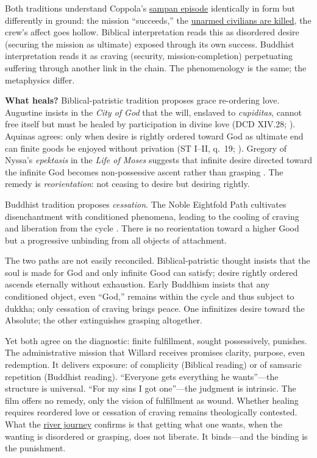 Both traditions understand Coppola's \hyperref[scene:sampan]{sampan episode} identically in
form but differently in ground: the mission ``succeeds,'' the
\hyperref[scene:sampan]{unarmed civilians are killed}, the crew's affect goes hollow. Biblical
interpretation reads this as disordered desire
(securing the mission as ultimate) exposed through its own success. Buddhist interpretation
reads it as craving (security, mission-completion) perpetuating suffering through another link
in the chain. The
phenomenology is the same; the metaphysics differ.

\textbf{What heals?} Biblical-patristic tradition proposes grace re-ordering love. Augustine
insists in the \emph{City of God} that the will, enslaved to \emph{cupiditas}, cannot free
itself but must be healed by participation in divine love (DCD XIV.28;
\parencite{AugustineCity2003}). Aquinas agrees: only when desire is rightly ordered toward God
as ultimate end can finite goods be enjoyed without privation (ST I--II, q.~19;
\parencite{AquinasST1947}). Gregory of Nyssa's \emph{epektasis} in the \emph{Life of Moses}
suggests that infinite desire directed toward the infinite God becomes non-possessive ascent
rather than grasping \parencite[pp.~113--114]{GregoryMoses1978}. The remedy is
\emph{reorientation}: not ceasing to desire but desiring rightly.

Buddhist tradition proposes \emph{cessation}. The Noble Eightfold Path cultivates
disenchantment with conditioned phenomena, leading to the cooling of craving and liberation
from the cycle \parencite[pp.~45--50]{Rahula1959}. There is no reorientation toward a higher
Good but a progressive unbinding from all objects of attachment.

The two paths are not easily reconciled. Biblical-patristic thought insists that the soul is
made for God and only infinite Good can satisfy; desire rightly ordered ascends eternally
without exhaustion. Early Buddhism insists that any conditioned object, even ``God,'' remains
within the cycle and thus subject to dukkha; only cessation of craving brings peace. One
infinitizes desire toward the Absolute; the other extinguishes grasping altogether.

Yet both agree on the diagnostic: finite fulfillment, sought possessively, punishes. The
administrative mission that Willard receives promises clarity, purpose, even redemption. It
delivers exposure: of complicity (Biblical reading) or of samsaric repetition (Buddhist
reading). ``Everyone gets everything he wants''---the structure is universal. ``For my sins I
got one''---the judgment is intrinsic. The film offers no remedy, only the vision of
fulfillment as wound. Whether healing requires reordered love or cessation of craving remains
theologically contested. What the \hyperref[scene:upriver-journey]{river journey} confirms is
that getting what one wants, when the wanting is disordered or grasping, does not liberate. It
binds---and the binding is the punishment.

